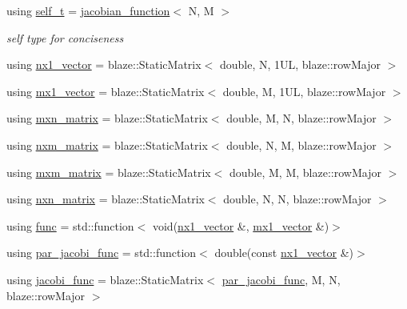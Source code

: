 \begin{DoxyCompactItemize}
\item 
\mbox{\label{classkafi_1_1jacobian__function_a2981d3ce9a411bfc393aaf3ba822cdbe}} 
using \hyperlink{classkafi_1_1jacobian__function_a2981d3ce9a411bfc393aaf3ba822cdbe}{self\+\_\+t} = \hyperlink{classkafi_1_1jacobian__function}{jacobian\+\_\+function}$<$ N, M $>$
\begin{DoxyCompactList}\small\item\em self type for conciseness \end{DoxyCompactList}\item 
using \hyperlink{classkafi_1_1jacobian__function_ad7e7a8fbfa3e2785798bd46e5307ca65}{nx1\+\_\+vector} = blaze\+::\+Static\+Matrix$<$ double, N, 1\+U\+L, blaze\+::row\+Major $>$
\item 
using \hyperlink{classkafi_1_1jacobian__function_ad8e32b40bc05db5ee53705a30257761d}{mx1\+\_\+vector} = blaze\+::\+Static\+Matrix$<$ double, M, 1\+U\+L, blaze\+::row\+Major $>$
\item 
using \hyperlink{classkafi_1_1jacobian__function_afdc859dfbc351b172814b235b577413f}{mxn\+\_\+matrix} = blaze\+::\+Static\+Matrix$<$ double, M, N, blaze\+::row\+Major $>$
\item 
using \hyperlink{classkafi_1_1jacobian__function_a3894846c2c1903184c3473698dc89152}{nxm\+\_\+matrix} = blaze\+::\+Static\+Matrix$<$ double, N, M, blaze\+::row\+Major $>$
\item 
using \hyperlink{classkafi_1_1jacobian__function_a3cfd8181614c2795ae040118ff143a8e}{mxm\+\_\+matrix} = blaze\+::\+Static\+Matrix$<$ double, M, M, blaze\+::row\+Major $>$
\item 
using \hyperlink{classkafi_1_1jacobian__function_a5bac68a534ee628e1e474cf46a7ff035}{nxn\+\_\+matrix} = blaze\+::\+Static\+Matrix$<$ double, N, N, blaze\+::row\+Major $>$
\item 
using \hyperlink{classkafi_1_1jacobian__function_a91cc300a9dba8c3e6787510d48e6fc37}{func} = std\+::function$<$ void(\hyperlink{classkafi_1_1jacobian__function_ad7e7a8fbfa3e2785798bd46e5307ca65}{nx1\+\_\+vector} \&, \hyperlink{classkafi_1_1jacobian__function_ad8e32b40bc05db5ee53705a30257761d}{mx1\+\_\+vector} \&)$>$
\item 
using \hyperlink{classkafi_1_1jacobian__function_a4133d937d8f1d502de7424cb1f4f4e36}{par\+\_\+jacobi\+\_\+func} = std\+::function$<$ double(const \hyperlink{classkafi_1_1jacobian__function_ad7e7a8fbfa3e2785798bd46e5307ca65}{nx1\+\_\+vector} \&)$>$
\item 
using \hyperlink{classkafi_1_1jacobian__function_ac8f4a65fbe71eb34d1b7914024ad2d85}{jacobi\+\_\+func} = blaze\+::\+Static\+Matrix$<$ \hyperlink{classkafi_1_1jacobian__function_a4133d937d8f1d502de7424cb1f4f4e36}{par\+\_\+jacobi\+\_\+func}, M, N, blaze\+::row\+Major $>$
\end{DoxyCompactItemize}
